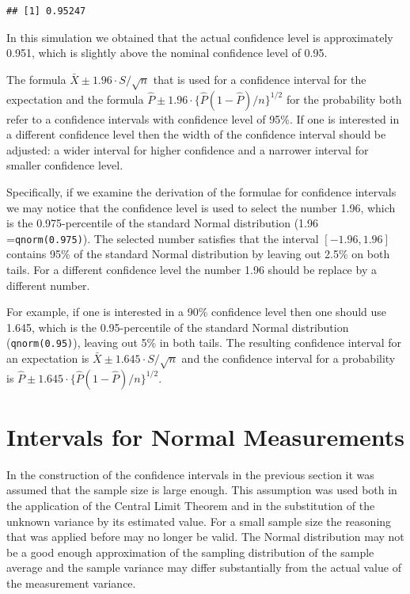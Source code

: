 \documentclass[]{krantz}
\theoremstyle{definition}
\theoremstyle{definition}
\theoremstyle{definition}
\theoremstyle{remark}
\begin{document}
\begin{verbatim}
## [1] 0.95247
\end{verbatim}

In this simulation we obtained that the actual confidence level is
approximately 0.951, which is slightly above the nominal confidence
level of 0.95.

The formula \(\bar X \pm 1.96 \cdot S/\sqrt{n}\) that is used for a
confidence interval for the expectation and the formula
\(\hat P \pm 1.96 \cdot \{\hat P (1-\hat P)/n\}^{1/2}\) for the
probability both refer to a confidence intervals with confidence level
of 95\%. If one is interested in a different confidence level then the
width of the confidence interval should be adjusted: a wider interval
for higher confidence and a narrower interval for smaller confidence
level.

Specifically, if we examine the derivation of the formulae for
confidence intervals we may notice that the confidence level is used to
select the number 1.96, which is the 0.975-percentile of the standard
Normal distribution (1.96 =\texttt{qnorm(0.975)}). The selected number
satisfies that the interval \([-1.96,1.96]\) contains 95\% of the standard
Normal distribution by leaving out 2.5\% on both tails. For a different
confidence level the number 1.96 should be replace by a different
number.

For example, if one is interested in a 90\% confidence level then one
should use 1.645, which is the 0.95-percentile of the standard Normal
distribution (\texttt{qnorm(0.95)}), leaving out 5\% in both tails. The
resulting confidence interval for an expectation is
\(\bar X \pm 1.645 \cdot S/\sqrt{n}\) and the confidence interval for a
probability is \(\hat P \pm 1.645 \cdot \{\hat P (1-\hat P)/n\}^{1/2}\).

\hypertarget{CInormal}{%
\section{Intervals for Normal Measurements}\label{CInormal}}

In the construction of the confidence intervals in the previous section
it was assumed that the sample size is large enough. This assumption was
used both in the application of the Central Limit Theorem and in the
substitution of the unknown variance by its estimated value. For a small
sample size the reasoning that was applied before may no longer be
valid. The Normal distribution may not be a good enough approximation of
the sampling distribution of the sample average and the sample variance
may differ substantially from the actual value of the measurement
variance.
\end{document}
